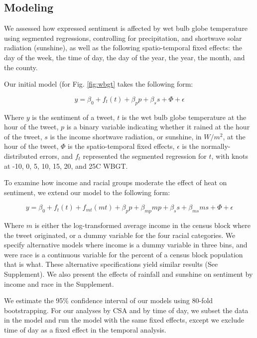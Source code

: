 \documentclass{article}
\begin{document}
\subsection{Modeling}
We assessed how expressed sentiment is affected by wet bulb globe temperature using segmented regressions, controlling for precipitation, and shortwave solar radiation (sunshine), as well as the following spatio-temporal fixed effects: the day of the week, the time of day, the day of the year, the year, the month, and the county.  

Our initial model (for Fig. \ref{fig:wbgt} takes the following form:

\begin{equation}
    y = \beta_0 + f_t(t) + \beta_p p + \beta_s s + \Phi + \epsilon
\end{equation}

Where $y$ is the sentiment of a tweet, $t$ is the wet bulb globe temperature at the hour of the tweet, $p$ is a binary variable indicating whether it rained at the hour of the tweet, $s$ is the income shortwave radiation, or sunshine, in $W/m^2$, at the hour of the tweet, $\Phi$ is the spatio-temporal fixed effects, $\epsilon$ is the normally-distributed errors, and $f_t$ represented the segmented regression for $t$, with knots at -10\textdegree, 0\textdegree, 5\textdegree, 10\textdegree, 15\textdegree, 20\textdegree, and 25\textdegree C WBGT.

To examine how income and racial groups moderate the effect of heat on sentiment, we extend our model to the following form:

\begin{equation}
    y = \beta_0 + f_t(t) + f_{mt}(m t) + \beta_p p + \beta_{mp} m p + \beta_s s + \beta_{ms} m s + \Phi + \epsilon
\end{equation}

Where $m$ is either the log-transformed average income in the census block where the tweet originated, or a dummy variable for the four racial categories.  We specify alternative models where income is a dummy variable in three bins, and were race is a continuous variable for the percent of a census block population that is what.  These alternative specifications yield similar results (See Supplement).  We also present the effects of rainfall and sunshine on sentiment by income and race in the Supplement.

We estimate the 95\% confidence interval of our models using 80-fold bootstrapping.  For our analyses by CSA and by time of day, we subset the data in the model and run the model with the same fixed effects, except we exclude time of day as a fixed effect in the temporal analysis.
\end{document}
